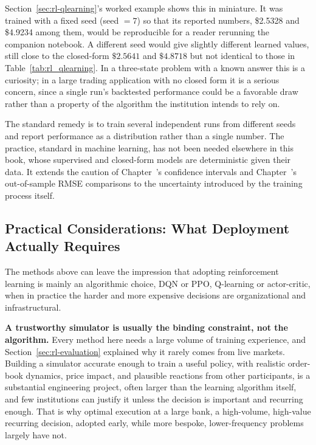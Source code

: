 \documentclass[../ai_in_finance]{subfiles}
\begin{document}
Section~\ref{sec:rl-qlearning}'s worked example shows this in miniature. It was trained with a fixed seed (seed $=7$) so that its reported numbers, \$2.5328 and \$4.9234 among them, would be reproducible for a reader rerunning the companion notebook. A different seed would give slightly different learned values, still close to the closed-form $\$2.5641$ and $\$4.8718$ but not identical to those in Table~\ref{tab:rl_qlearning}. In a three-state problem with a known answer this is a curiosity; in a large trading application with no closed form it is a serious concern, since a single run's backtested performance could be a favorable draw rather than a property of the algorithm the institution intends to rely on.

The standard remedy is to train several independent runs from different seeds and report performance as a distribution rather than a single number. The practice, standard in machine learning, has not been needed elsewhere in this book, whose supervised and closed-form models are deterministic given their data. It extends the caution of Chapter~'s confidence intervals and Chapter~'s out-of-sample RMSE comparisons to the uncertainty introduced by the training process itself.

\subsection{Practical Considerations: What Deployment Actually Requires}
\label{sec:rl-practical}

The methods above can leave the impression that adopting reinforcement learning is mainly an algorithmic choice, DQN or PPO, Q-learning or actor-critic, when in practice the harder and more expensive decisions are organizational and infrastructural.

\textbf{A trustworthy simulator is usually the binding constraint, not the algorithm.} Every method here needs a large volume of training experience, and Section~\ref{sec:rl-evaluation} explained why it rarely comes from live markets. Building a simulator accurate enough to train a useful policy, with realistic order-book dynamics, price impact, and plausible reactions from other participants, is a substantial engineering project, often larger than the learning algorithm itself, and few institutions can justify it unless the decision is important and recurring enough. That is why optimal execution at a large bank, a high-volume, high-value recurring decision, adopted early, while more bespoke, lower-frequency problems largely have not.
\end{document}
